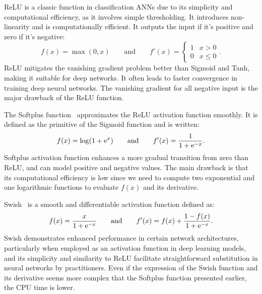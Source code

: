 \documentclass[algorithms,article,submit,pdftex,oneauthors]{Definitions/mdpi}
\DeclareRobustCommand{\e}[1]{{\rm e}^{#1}}
\begin{document}
ReLU is a classic function in classification ANNs due to its simplicity and computational efficiency, as it involves simple thresholding.
It introduces non-linearity and is computationally efficient.
It outputs the input if it's positive and zero if it's negative:
\begin{equation}
f(x) = \max(0,x)\qquad \text{and}\qquad f'(x) =
\begin{cases}
1&x>0\\
0&x\le 0
\end{cases}.\label{eq:act-relu}
\end{equation}
ReLU mitigates the vanishing gradient problem better than Sigmoid and Tanh, making it suitable for deep networks.
It often leads to faster convergence in training deep neural networks.
The vanishing gradient for all negative input is the major drawback of the ReLU function.

The Softplus function~\cite{Dugas-2000-ISO} approximates the ReLU activation function smoothly.
It is defined as the primitive of the Sigmoid function and is written:
\begin{equation}
f(x) = \log\left(1+\e{x}\right)\qquad \text{and}\qquad f'(x) = \frac{1}{1+\e{-x}}.\label{eq:act-softplus}
\end{equation}
Softplus activation function enhances a more gradual transition from zero than ReLU, and can model positive and negative values.
The main drawback is that its computational efficiency is low since we need to compute two exponential and one logarithmic functions to evaluate $f(x)$ and its derivative.

Swish~\cite{Ramachandran-2018-SAF} is a smooth and differentiable activation function defined as:
\begin{equation}
f(x) = \frac{x}{1+\e{-x}}\qquad \text{and}\qquad f'(x) = f(x) + \frac{1 - f(x)}{1+\e{-x}}.\label{eq:act-swish}
\end{equation}
Swish demonstrates enhanced performance in certain network architectures, particularly when employed as an activation function in deep learning models, and its simplicity and similarity to ReLU facilitate straightforward substitution in neural networks by practitioners.
Even if the expression of the Swish function and its derivative seems more complex that the Softplus function presented earlier, the CPU time is lower.
\end{document}
